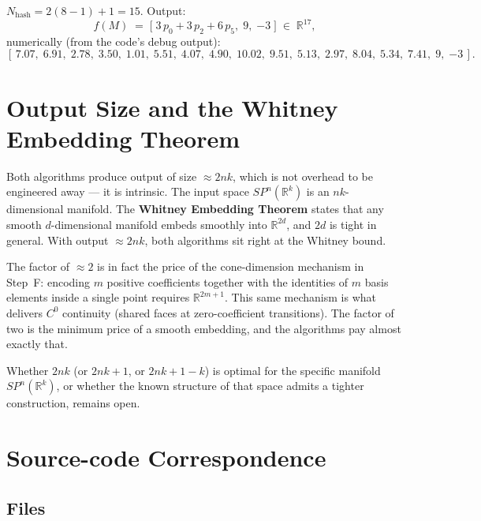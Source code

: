 \documentclass[11pt,a4paper]{article}
\newcommand{\R}{\mathbb{R}}
\newcommand{\SP}[2]{SP^{#1}(\R^{#2})}  %
\begin{document}
$N_{\text{hash}} = 2(8{-}1){+}1 = 15$. Output:
\[
  f(M) \;=\;
  \bigl[\;3\,p_0 + 3\,p_2 + 6\,p_5,\;9,\;{-3}\;\bigr]
  \;\in\; \R^{17},
\]
numerically (from the code's debug output):
\[
  [\,7.07,\;6.91,\;2.78,\;3.50,\;1.01,\;5.51,\;4.07,\;4.90,\;10.02,\;
   9.51,\;5.13,\;2.97,\;8.04,\;5.34,\;7.41,\;9,\;{-3}\,].
\]

\section{Output Size and the Whitney Embedding Theorem}
\label{sec:whitney}

Both algorithms produce output of size $\approx 2nk$, which is not overhead to
be engineered away — it is intrinsic.  The input space $\SP{n}{k}$ is an
$nk$-dimensional manifold.  The \textbf{Whitney Embedding Theorem} states that
any smooth $d$-dimensional manifold embeds smoothly into $\R^{2d}$, and $2d$
is tight in general.  With output $\approx 2nk$, both algorithms sit right at
the Whitney bound.

The factor of $\approx 2$ is in fact the price of the cone-dimension mechanism
in Step~F: encoding $m$ positive coefficients together with the identities of
$m$ basis elements inside a single point requires $\R^{2m+1}$.  This same
mechanism is what delivers $C^0$ continuity (shared faces at zero-coefficient
transitions).  The factor of two is the minimum price of a smooth
embedding, and the algorithms pay almost exactly that.

Whether $2nk$ (or $2nk+1$, or $2nk+1-k$) is optimal for the specific
manifold $\SP{n}{k}$, or whether the known structure of that space admits a
tighter construction, remains open.

\appendix
\section{Source-code Correspondence}
\label{app:code}

\subsection*{Files}
\end{document}

